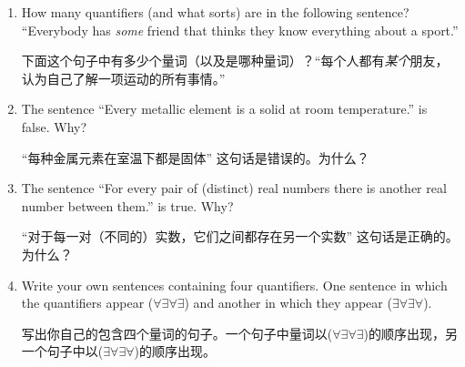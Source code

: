 \begin{enumerate}

    \item How many quantifiers (and what sorts) are in the following sentence?
    ``Everybody has \emph{some} friend that thinks they know everything about 
    a sport.''
    
    下面这个句子中有多少个量词（以及是哪种量词）？“每个人都有\emph{某个}朋友，认为自己了解一项运动的所有事情。”
      
    \wbvfill
    
    
    \item The sentence ``Every metallic element is a solid at room temperature.'' 
    is false. Why?
    
    “每种金属元素在室温下都是固体” 这句话是错误的。为什么？
    
    \wbvfill
    
    
    \item The sentence ``For every pair of (distinct) real numbers there is 
    another real number between them.'' is true. Why?
    
    “对于每一对（不同的）实数，它们之间都存在另一个实数” 这句话是正确的。为什么？
    
    \wbvfill
    
    
    \item Write your own sentences containing four quantifiers. One
    sentence in which the quantifiers appear ($\forall \exists \forall \exists$)
    and another in which they appear ($\exists \forall \exists \forall$).
    
    写出你自己的包含四个量词的句子。一个句子中量词以($\forall \exists \forall \exists$)的顺序出现，另一个句子中以($\exists \forall \exists \forall$)的顺序出现。
    \wbvfill
    
    
    \end{enumerate}